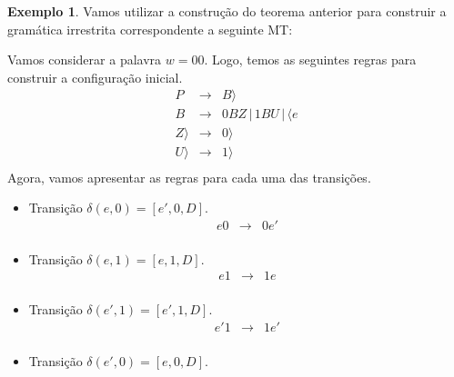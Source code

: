 \documentclass[a4paper]{article}
\theoremstyle{definition}
\newtheorem{Example}{Exemplo}
\begin{document}
  \begin{Example}
    Vamos utilizar a construção do teorema anterior para construir a gramática
    irrestrita correspondente a seguinte MT:
    \begin{figure}[H]
      \centering
    \end{figure}
    Vamos considerar a palavra $w = 00$. Logo, temos as seguintes regras para
    construir a configuração inicial.
    \[
      \begin{array}{lcl}
        P & \to & B \rangle \\
        B & \to & 0 B Z \,|\, 1 B U \,|\, \langle e \\
        Z \rangle & \to & 0 \rangle \\
        U \rangle & \to & 1 \rangle \\
      \end{array}
    \]
    Agora, vamos apresentar as regras para cada uma das transições.
    \begin{itemize}
       \item Transição $\delta(e,0) = [e',0, D]$.
         \[
           \begin{array}{lcl}
             e0 & \to & 0e' \\
           \end{array}
         \]
       \item Transição $\delta(e,1) = [e,1,D]$.
         \[
           \begin{array}{lcl}
             e1 & \to & 1e\\
           \end{array}
         \]
       \item Transição $\delta(e',1) = [e',1,D]$.
         \[
           \begin{array}{lcl}
             e'1 & \to & 1e'\\
           \end{array}           
         \]
       \item Transição $\delta(e',0) = [e,0, D]$.
         \[
\]
\end{itemize}
\end{Example}
\end{document}
